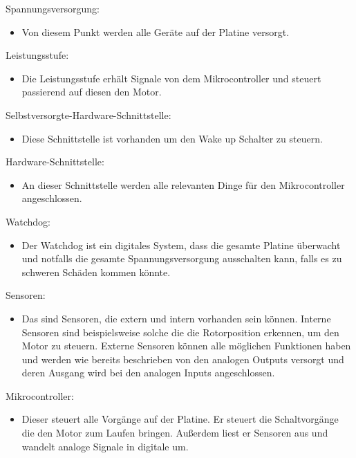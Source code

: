 Spannungsversorgung:
\begin{itemize}
    \item Von diesem Punkt werden alle Geräte auf der Platine versorgt. \cite{SONCEBOZ}
\end{itemize}

Leistungsstufe:
\begin{itemize}
    \item Die Leistungsstufe erhält Signale von dem Mikrocontroller und steuert passierend auf diesen den Motor. \cite{SONCEBOZ}
\end{itemize}

Selbstversorgte-Hardware-Schnittstelle:
\begin{itemize}
    \item Diese Schnittstelle ist vorhanden um den Wake up Schalter zu steuern. \cite{SONCEBOZ}
\end{itemize}

Hardware-Schnittstelle:
\begin{itemize}
    \item An dieser Schnittstelle werden alle relevanten Dinge für den Mikrocontroller angeschlossen. \cite{SONCEBOZ}
\end{itemize}

\clearpage
Watchdog:
\begin{itemize}
    \item Der Watchdog ist ein digitales System, dass die gesamte Platine überwacht und notfalls die gesamte Spannungsversorgung ausschalten kann, falls es zu schweren Schäden kommen könnte. \cite{SONCEBOZ}
\end{itemize}

Sensoren:
\begin{itemize}
    \item Das sind Sensoren, die extern und intern vorhanden sein können. Interne Sensoren sind beispielsweise solche die die Rotorposition erkennen, um den Motor zu steuern. Externe Sensoren können alle möglichen Funktionen haben und werden wie bereits beschrieben von den analogen Outputs versorgt und deren Ausgang wird bei den analogen Inputs angeschlossen. \cite{SONCEBOZ}
\end{itemize}

Mikrocontroller:
\begin{itemize}
    \item Dieser steuert alle Vorgänge auf der Platine. Er steuert die Schaltvorgänge die den Motor zum Laufen bringen. Au{\ss}erdem liest er Sensoren aus und wandelt analoge Signale in digitale um. \cite{SONCEBOZ}
\end{itemize}

